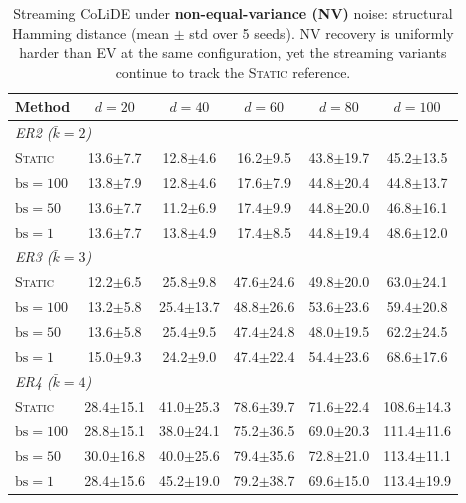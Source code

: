 \begin{table}[t]
\centering
\caption{Streaming CoLiDE under \textbf{non-equal-variance (NV)} noise:
structural Hamming distance (mean $\pm$ std over 5 seeds). NV recovery
is uniformly harder than EV at the same configuration, yet the
streaming variants continue to track the \textsc{Static} reference.}
\label{tab:sem-nv-shd}
\setlength{\tabcolsep}{6pt}
\begin{tabular}{l ccccc}
\toprule
\textbf{Method} & $d{=}20$ & $d{=}40$ & $d{=}60$ & $d{=}80$ & $d{=}100$ \\
\midrule
\multicolumn{6}{l}{\textit{ER2  ($\bar{k} = 2$)}} \\
\midrule
\textsc{Static} & 13.6$\pm$7.7 & 12.8$\pm$4.6 & 16.2$\pm$9.5 & 43.8$\pm$19.7 & 45.2$\pm$13.5 \\
$\mathrm{bs}{=}100$ & 13.8$\pm$7.9 & 12.8$\pm$4.6 & 17.6$\pm$7.9 & 44.8$\pm$20.4 & 44.8$\pm$13.7 \\
$\mathrm{bs}{=}50$  & 13.6$\pm$7.7 & 11.2$\pm$6.9 & 17.4$\pm$9.9 & 44.8$\pm$20.0 & 46.8$\pm$16.1 \\
$\mathrm{bs}{=}1$   & 13.6$\pm$7.7 & 13.8$\pm$4.9 & 17.4$\pm$8.5 & 44.8$\pm$19.4 & 48.6$\pm$12.0 \\
\midrule
\multicolumn{6}{l}{\textit{ER3  ($\bar{k} = 3$)}} \\
\midrule
\textsc{Static} & 12.2$\pm$6.5 & 25.8$\pm$9.8 & 47.6$\pm$24.6 & 49.8$\pm$20.0 & 63.0$\pm$24.1 \\
$\mathrm{bs}{=}100$ & 13.2$\pm$5.8 & 25.4$\pm$13.7 & 48.8$\pm$26.6 & 53.6$\pm$23.6 & 59.4$\pm$20.8 \\
$\mathrm{bs}{=}50$  & 13.6$\pm$5.8 & 25.4$\pm$9.5 & 47.4$\pm$24.8 & 48.0$\pm$19.5 & 62.2$\pm$24.5 \\
$\mathrm{bs}{=}1$   & 15.0$\pm$9.3 & 24.2$\pm$9.0 & 47.4$\pm$22.4 & 54.4$\pm$23.6 & 68.6$\pm$17.6 \\
\midrule
\multicolumn{6}{l}{\textit{ER4  ($\bar{k} = 4$)}} \\
\midrule
\textsc{Static} & 28.4$\pm$15.1 & 41.0$\pm$25.3 & 78.6$\pm$39.7 & 71.6$\pm$22.4 & 108.6$\pm$14.3 \\
$\mathrm{bs}{=}100$ & 28.8$\pm$15.1 & 38.0$\pm$24.1 & 75.2$\pm$36.5 & 69.0$\pm$20.3 & 111.4$\pm$11.6 \\
$\mathrm{bs}{=}50$  & 30.0$\pm$16.8 & 40.0$\pm$25.6 & 79.4$\pm$35.6 & 72.8$\pm$21.0 & 113.4$\pm$11.1 \\
$\mathrm{bs}{=}1$   & 28.4$\pm$15.6 & 45.2$\pm$19.0 & 79.2$\pm$38.7 & 69.6$\pm$15.0 & 113.4$\pm$19.9 \\
\bottomrule
\end{tabular}
\end{table}


